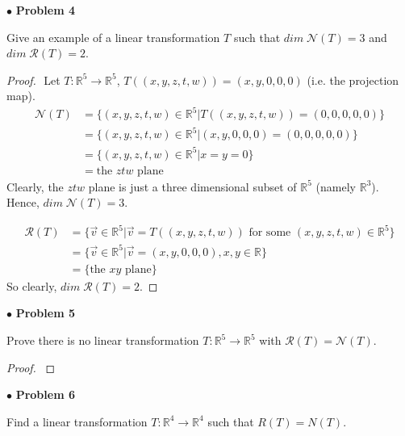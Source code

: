\documentclass{article}
\begin{document}
\newpage
$ \bullet$ \textbf{Problem 4}
\medskip

\begin{itshape}
Give an example of a linear transformation $T$ such that $dim \; \mathcal{N}(T) = 3$ and  $dim \; \mathcal{R}(T) =2$.
\end{itshape}
\medskip

\begin{proof}
$ $\newline
Let $T: \mathbb{R}^5 \to \mathbb{R}^5$, $T((x,y,z,t,w)) = (x,y,0,0,0)$ (i.e. the projection map).
\begin{align*}
\mathcal{N}(T) &= \{ (x,y,z,t,w) \in \mathbb{R}^5 | T((x,y,z,t,w))  = (0,0,0,0,0) \} \\
&= \{ (x,y,z,t,w) \in \mathbb{R}^5 | (x,y,0,0,0) = (0,0,0,0,0) \} \\ 
&= \{ (x,y,z,t,w) \in \mathbb{R}^5 | x = y =0 \}\\
&= \text{the }ztw \text{ plane}
\end{align*}
Clearly, the $ztw$ plane is just a three dimensional subset of $\mathbb{R}^5$ (namely $\mathbb{R}^3$). Hence, $dim \; \mathcal{N}(T) = 3$.

\begin{align*}
\mathcal{R}(T) &= \{ \vec{v} \in \mathbb{R}^5 | \vec{v} = T((x,y,z,t,w)) \text{ for some } (x,y,z,t,w) \in \mathbb{R}^5 \} \\
&= \{ \vec{v} \in \mathbb{R}^5 | \vec{v} = (x,y,0,0,0), x,y \in \mathbb{R} \} \\
&= \{ \text{the } xy \text{ plane} \}
\end{align*}
So clearly, $dim \; \mathcal{R}(T) = 2$.
\end{proof}

\newpage
$ \bullet$ \textbf{Problem 5}
\medskip

\begin{itshape}
Prove there is no linear transformation $T: \mathbb{R}^5 \to \mathbb{R}^5$ with $\mathcal{R}(T) = \mathcal{N}(T)$.
\end{itshape}
\medskip

\begin{proof}
$ $\newline
\end{proof}

\newpage
$ \bullet$ \textbf{Problem 6}
\medskip

\begin{itshape}
Find a linear transformation $T: \mathbb{R}^4 \to \mathbb{R}^4$ such that $R(T)=N(T)$.
\end{itshape}
\medskip
\end{document}
